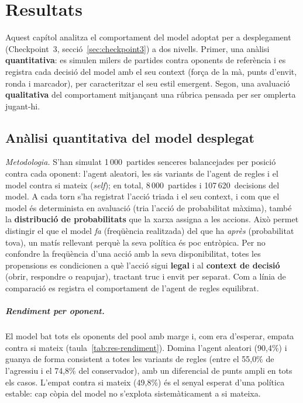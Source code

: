 
\chapter{Resultats}
\label{cap:resultats}

Aquest capítol analitza el comportament del model adoptat per a desplegament
(Checkpoint~3, secció~\ref{sec:checkpoint3}) a dos nivells. Primer, una anàlisi
\textbf{quantitativa}: es simulen milers de partides contra oponents de referència i es
registra cada decisió del model amb el seu context (força de la mà, punts d'envit, ronda i
marcador), per caracteritzar el seu estil emergent. Segon, una avaluació \textbf{qualitativa}
del comportament mitjançant una rúbrica pensada per ser omplerta jugant-hi.

\section{Anàlisi quantitativa del model desplegat}
\label{sec:res-quantitativa}

\emph{Metodologia.} S'han simulat 1\,000~partides senceres balancejades per posició contra
cada oponent: l'agent aleatori, les sis variants de l'agent de regles i el model contra si
mateix (\emph{self}); en total, 8\,000~partides i 107\,620~decisions del model. A cada torn
s'ha registrat l'acció triada i el seu context, i com que el model és determinista en
avaluació (tria l'acció de probabilitat màxima), també la \textbf{distribució de
probabilitats} que la xarxa assigna a les accions. Això permet distingir el que el model
\emph{fa} (freqüència realitzada) del que ha \emph{après} (probabilitat tova), un matís
rellevant perquè la seva política és poc entròpica. Per no confondre la freqüència d'una
acció amb la seva disponibilitat, totes les propensions es condicionen a què l'acció sigui
\textbf{legal} i al \textbf{context de decisió} (obrir, respondre o reapujar), tractant truc
i envit per separat. Com a línia de comparació es registra el comportament de l'agent de
regles equilibrat.

\paragraph{Rendiment per oponent.} El model bat tots els oponents del pool amb marge i, com
era d'esperar, empata contra si mateix (taula~\ref{tab:res-rendiment}). Domina l'agent
aleatori (90{,}4\%) i guanya de forma consistent a totes les variants de regles (entre el
55{,}0\% de l'agressiu i el 74{,}8\% del conservador), amb un diferencial de punts ampli en
tots els casos. L'empat contra si mateix (49{,}8\%) és el senyal esperat d'una política
estable: cap còpia del model no s'explota sistemàticament a si mateixa.

